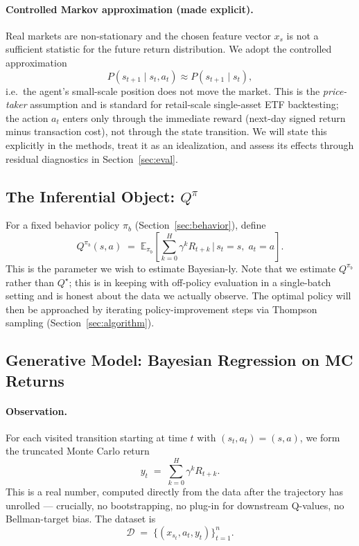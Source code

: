 \documentclass[11pt]{article}
\newcommand{\E}{\mathbb{E}}
\newcommand{\D}{\mathcal{D}}
\begin{document}
\paragraph{Controlled Markov approximation (made explicit).} Real markets are non-stationary and the chosen feature vector $x_s$ is not a sufficient statistic for the future return distribution. We adopt the controlled approximation
\begin{equation}
\label{eq:controlled-markov}
P(s_{t+1} \mid s_t, a_t) \approx P(s_{t+1} \mid s_t),
\end{equation}
i.e.\ the agent's small-scale position does not move the market. This is the \emph{price-taker} assumption and is standard for retail-scale single-asset ETF backtesting; the action $a_t$ enters only through the immediate reward (next-day signed return minus transaction cost), not through the state transition. We will state this explicitly in the methods, treat it as an idealization, and assess its effects through residual diagnostics in Section~\ref{sec:eval}.

\subsection{The Inferential Object: $Q^\pi$}
For a fixed behavior policy $\pi_b$ (Section~\ref{sec:behavior}), define
\[
Q^{\pi_b}(s, a) \;=\; \E_{\pi_b}\!\left[\sum_{k=0}^{H} \gamma^k R_{t+k} \,\Big|\, s_t = s,\; a_t = a\right].
\]
This is the parameter we wish to estimate Bayesian-ly. Note that we estimate $Q^{\pi_b}$ rather than $Q^\star$; this is in keeping with off-policy evaluation in a single-batch setting and is honest about the data we actually observe. The optimal policy will then be approached by iterating policy-improvement steps via Thompson sampling (Section~\ref{sec:algorithm}).

\subsection{Generative Model: Bayesian Regression on MC Returns}
\label{sec:genmodel}

\paragraph{Observation.} For each visited transition starting at time $t$ with $(s_t, a_t) = (s, a)$, we form the truncated Monte Carlo return
\begin{equation}
\label{eq:mc-return}
\boxed{\; y_t \;=\; \sum_{k=0}^{H} \gamma^k R_{t+k}. \;}
\end{equation}
This is a real number, computed directly from the data after the trajectory has unrolled --- crucially, no bootstrapping, no plug-in for downstream Q-values, no Bellman-target bias. The dataset is
\[
\D \;=\; \big\{(x_{s_t}, a_t, y_t)\big\}_{t=1}^{n}.
\]
\end{document}
